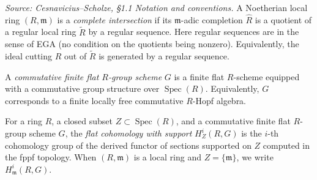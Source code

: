 \begin{definition}
  \label{def:ci_local_ring}
  \uses{}
  \textit{Source: Cesnavicius--Scholze, \S1.1 Notation and conventions.}
  A Noetherian local ring \((R, \mathfrak{m})\) is a \emph{complete intersection} if its \(\mathfrak{m}\)-adic completion \(\widehat{R}\) is a quotient of a regular local ring \(\widetilde{R}\) by a regular sequence. Here regular sequences are in the sense of EGA (no condition on the quotients being nonzero). Equivalently, the ideal cutting \(\widehat{R}\) out of \(\widetilde{R}\) is generated by a regular sequence.
\end{definition}

\begin{definition}
  \label{def:finite_flat_group}
  \uses{}
  A \emph{commutative finite flat \(R\)-group scheme} \(G\) is a finite flat \(R\)-scheme equipped with a commutative group structure over \(\operatorname{Spec}(R)\). Equivalently, \(G\) corresponds to a finite locally free commutative \(R\)-Hopf algebra.
\end{definition}

\begin{definition}
  \label{def:flat_cohomology_support}
  \uses{}
  For a ring \(R\), a closed subset \(Z \subset \operatorname{Spec}(R)\), and a commutative finite flat \(R\)-group scheme \(G\), the \emph{flat cohomology with support} \(H^i_Z(R, G)\) is the \(i\)-th cohomology group of the derived functor of sections supported on \(Z\) computed in the fppf topology. When \((R, \mathfrak{m})\) is a local ring and \(Z = \{\mathfrak{m}\}\), we write \(H^i_{\mathfrak{m}}(R, G)\).
\end{definition}

